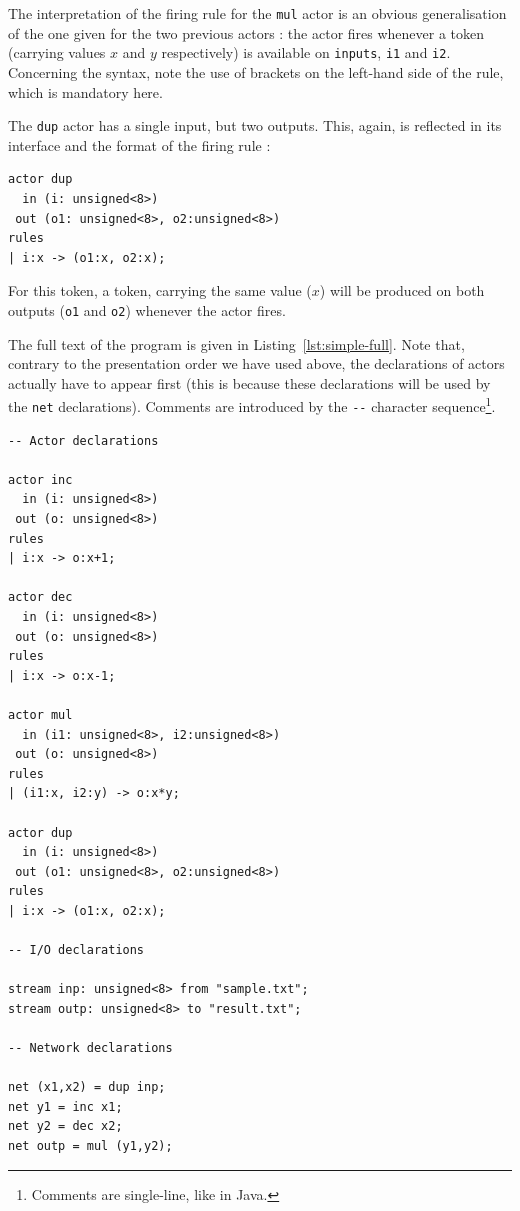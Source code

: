 The interpretation of the firing rule for the \texttt{mul} actor is an obvious generalisation of the
one given for the two previous actors : the actor fires whenever a token (carrying values $x$ and
$y$ respectively) is available on \texttt{inputs}, \texttt{i1} and \texttt{i2}.  Concerning the
syntax, note the use of brackets on the left-hand side of the rule, which is mandatory here.

\medskip
The \texttt{dup} actor has a single input, but two outputs. This, again, is reflected in its
interface and the format of the firing rule :

\begin{lstlisting}[style=CaphStyle]
actor dup
  in (i: unsigned<8>)
 out (o1: unsigned<8>, o2:unsigned<8>)
rules
| i:x -> (o1:x, o2:x);
\end{lstlisting}

For this token, a token, carrying the same value ($x$) will be produced on both outputs
(\texttt{o1} and \texttt{o2}) whenever the actor fires.

\medskip
The full text of the program is given in Listing~\ref{lst:simple-full}. Note that, contrary to the
presentation order we have used above, the declarations of actors actually have to appear first
(this is because these declarations will be used by the \texttt{net} declarations). Comments are
introduced by the \verb|--| character sequence\footnote{Comments are single-line, like in Java.}. 

\begin{lstlisting}[style=CaphStyle,caption={Complete CAPH source code for the application
    depicted in Fig.~\ref{fig:networkfour}},label={lst:simple-full}]
-- Actor declarations

actor inc
  in (i: unsigned<8>)
 out (o: unsigned<8>)
rules
| i:x -> o:x+1;

actor dec
  in (i: unsigned<8>)
 out (o: unsigned<8>)
rules
| i:x -> o:x-1;

actor mul
  in (i1: unsigned<8>, i2:unsigned<8>)
 out (o: unsigned<8>)
rules
| (i1:x, i2:y) -> o:x*y;

actor dup
  in (i: unsigned<8>)
 out (o1: unsigned<8>, o2:unsigned<8>)
rules
| i:x -> (o1:x, o2:x);

-- I/O declarations

stream inp: unsigned<8> from "sample.txt";
stream outp: unsigned<8> to "result.txt";

-- Network declarations

net (x1,x2) = dup inp;
net y1 = inc x1;
net y2 = dec x2;
net outp = mul (y1,y2);
\end{lstlisting}

